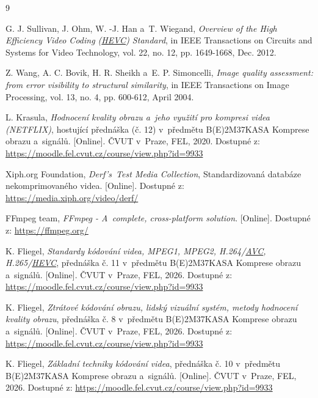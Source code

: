 \documentclass[11pt,a4paper]{article}
\begin{document}
\newpage
\begin{thebibliography}{9}
\sloppy
{}

G. J. Sullivan, J. Ohm, W. -J. Han a~T. Wiegand, \textit{Overview of the High Efficiency Video Coding (\hyperref[sec:standards]{HEVC}) Standard}, in IEEE Transactions on Circuits and Systems for Video Technology, vol. 22, no. 12, pp. 1649-1668, Dec. 2012.

Z. Wang, A. C. Bovik, H. R. Sheikh a~E. P. Simoncelli, \textit{Image quality assessment: from error visibility to structural similarity}, in IEEE Transactions on Image Processing, vol. 13, no. 4, pp. 600-612, April 2004.

L. Krasula, \textit{Hodnocení kvality obrazu a~jeho využití pro kompresi videa (NETFLIX)}, hostující přednáška (č. 12) v~předmětu B(E)2M37KASA Komprese obrazu a~signálů. [Online]. ČVUT v~Praze, FEL, 2020. Dostupné z: \url{https://moodle.fel.cvut.cz/course/view.php?id=9933}

Xiph.org Foundation, \textit{Derf's~Test Media Collection}, Standardizovaná databáze nekomprimovaného videa. [Online]. Dostupné z: \url{https://media.xiph.org/video/derf/}

FFmpeg team, \textit{FFmpeg - A~complete, cross-platform solution}. [Online]. Dostupné z: \url{https://ffmpeg.org/}

K. Fliegel, \textit{Standardy kódování videa, MPEG1, MPEG2, H.264/\hyperref[sec:standards]{AVC}, H.265/\hyperref[sec:standards]{HEVC}}, přednáška č. 11 v~předmětu B(E)2M37KASA Komprese obrazu a~signálů. [Online]. ČVUT v~Praze, FEL, 2026. Dostupné z: \url{https://moodle.fel.cvut.cz/course/view.php?id=9933}

K. Fliegel, \textit{Ztrátové kódování obrazu, lidský vizuální systém, metody hodnocení kvality obrazu}, přednáška č. 8 v~předmětu B(E)2M37KASA Komprese obrazu a~signálů. [Online]. ČVUT v~Praze, FEL, 2026. Dostupné z: \url{https://moodle.fel.cvut.cz/course/view.php?id=9933}

K. Fliegel, \textit{Základní techniky kódování videa}, přednáška č. 10 v~předmětu B(E)2M37KASA Komprese obrazu a~signálů. [Online]. ČVUT v~Praze, FEL, 2026. Dostupné z: \url{https://moodle.fel.cvut.cz/course/view.php?id=9933}

\end{thebibliography}
\end{document}
